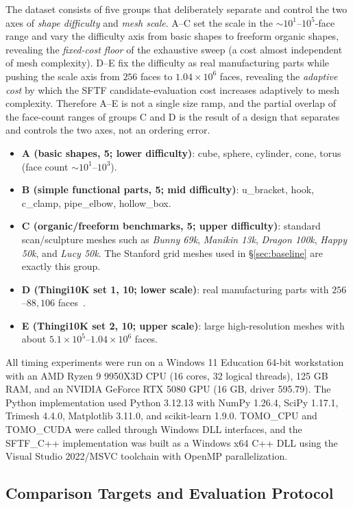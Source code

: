 \documentclass[11pt,a4paper]{article}
\begin{document}
The dataset consists of five groups that deliberately separate and control the two axes of \emph{shape difficulty} and \emph{mesh scale}.
A--C set the scale in the $\sim$$10^1$--$10^5$-face range and vary the difficulty axis from basic shapes to freeform organic shapes,
revealing the \emph{fixed-cost floor} of the exhaustive sweep (a cost almost independent of mesh complexity).
D--E fix the difficulty as real manufacturing parts while pushing the scale axis from $256$ faces to $1.04\times10^6$ faces,
revealing the \emph{adaptive cost} by which the SFTF candidate-evaluation cost increases adaptively to mesh complexity.
Therefore A--E is not a single size ramp, and the partial overlap of the face-count ranges of groups C and D
is the result of a design that separates and controls the two axes, not an ordering error.
\begin{itemize}
\item \textbf{A (basic shapes, 5; lower difficulty)}: cube, sphere, cylinder, cone, torus (face count $\sim$$10^1$--$10^3$).
\item \textbf{B (simple functional parts, 5; mid difficulty)}: u\_bracket, hook, c\_clamp, pipe\_elbow, hollow\_box.
\item \textbf{C (organic/freeform benchmarks, 5; upper difficulty)}: standard scan/sculpture meshes such as \emph{Bunny 69k}, \emph{Manikin 13k}, \emph{Dragon 100k}, \emph{Happy 50k}, and \emph{Lucy 50k}. The Stanford grid meshes used in \S\ref{sec:baseline} are exactly this group.
\item \textbf{D (Thingi10K set 1, 10; lower scale)}: real manufacturing parts with $256$--$88{,}106$ faces~\cite{Thingi10K}.
\item \textbf{E (Thingi10K set 2, 10; upper scale)}: large high-resolution meshes with about $5.1\times10^5$--$1.04\times10^6$ faces.
\end{itemize}
All timing experiments were run on a Windows 11 Education 64-bit workstation with an AMD Ryzen 9 9950X3D CPU
(16 cores, 32 logical threads), 125 GB RAM, and an NVIDIA GeForce RTX 5080 GPU (16 GB, driver 595.79).
The Python implementation used Python 3.12.13 with NumPy 1.26.4, SciPy 1.17.1, Trimesh 4.4.0, Matplotlib 3.11.0, and scikit-learn 1.9.0.
TOMO\_CPU and TOMO\_CUDA were called through Windows DLL interfaces, and the SFTF\_C++ implementation was built as a Windows x64 C++ DLL
using the Visual Studio 2022/MSVC toolchain with OpenMP parallelization.

\subsection{Comparison Targets and Evaluation Protocol}
\label{sec:protocol}
\end{document}
